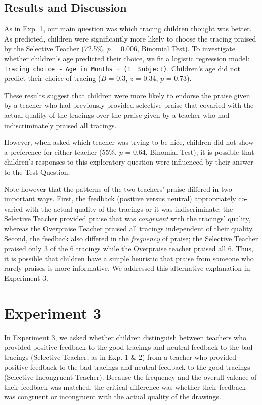 \documentclass[10pt, letterpaper]{article}
\begin{document}
\subsection{Results and Discussion}\label{results-and-discussion-1}

As in Exp. 1, our main question was which tracing children thought was
better. As predicted, children were significantly more likely to choose
the tracing praised by the Selective Teacher (72.5\%, \(p\) = 0.006,
Binomial Test). To investigate whether children's age predicted their
choice, we fit a logistic regression model:
\texttt{Tracing\ choice\ \textasciitilde{}\ Age\ in\ Months\ +\ (1\ \textbar{}\ Subject)}.
Children's age did not predict their choice of tracing (\(B\) = 0.3,
\(z\) = 0.34, \(p\) = 0.73).

These results suggest that children were more likely to endorse the
praise given by a teacher who had previously provided selective praise
that covaried with the actual quality of the tracings over the praise
given by a teacher who had indiscriminately praised all tracings.

However, when asked which teacher was trying to be nice, children did
not show a preference for either teacher (55\%, \(p\) = 0.64, Binomial
Test); it is possible that children's responses to this exploratory
question were influenced by their answer to the Test Question.

Note however that the patterns of the two teachers' praise differed in
two important ways. First, the feedback (positive versus neutral)
appropriately co-varied with the actual quality of the tracings or it
was indiscriminate; the Selective Teacher provided praise that was
\textit{congruent} with the tracings' quality, whereas the Overpraise
Teacher praised all tracings independent of their quality. Second, the
feedback also differed in the \emph{frequency} of praise; the Selective
Teacher praised only 3 of the 6 tracings while the Overpraise teacher
praised all 6. Thus, it is possible that children have a simple
heuristic that praise from someone who rarely praises is more
informative. We addressed this alternative explanation in Experiment 3.

\section{Experiment 3}\label{experiment-3}

In Experiment 3, we asked whether children distinguish between teachers
who provided positive feedback to the good tracings and neutral feedback
to the bad tracings (Selective Teacher, as in Exp. 1 \& 2) from a
teacher who provided positive feedback to the bad tracings and neutral
feedback to the good tracings (Selective-Incongruent Teacher). Because
the frequency and the overall valence of their feedback was matched, the
critical difference was whether their feedback was congruent or
incongruent with the actual quality of the drawings.
\end{document}
